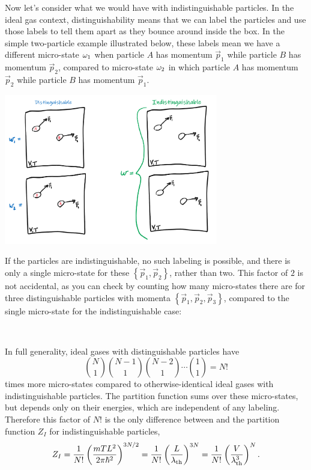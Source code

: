 Now let's consider what we would have with indistinguishable particles.
In the ideal gas context, distinguishability means that we can label the particles and use those labels to tell them apart as they bounce around inside the box.
In the simple two-particle example illustrated below, these labels mean we have a different micro-state $\omega_1$ when particle $A$ has momentum $\vec p_1$ while particle $B$ has momentum $\vec p_2$, compared to micro-state $\omega_2$ in which particle $A$ has momentum $\vec p_2$ while particle $B$ has momentum $\vec p_1$.
\begin{center}
  \includegraphics[width=0.7\textwidth]{figs/week04_distinguish.pdf}
\end{center}
If the particles are indistinguishable, no such labeling is possible, and there is only a single micro-state for these $\left\{\vec p_1, \vec p_2\right\}$, rather than two.
This factor of $2$ is not accidental, as you can check by counting how many micro-states there are for three distinguishable particles with momenta $\left\{\vec p_1, \vec p_2, \vec p_3\right\}$, compared to the single micro-state for the indistinguishable case:
\begin{mdframed}
  \ \\[100 pt]
\end{mdframed}

In full generality, ideal gases with distinguishable particles have
\begin{equation*}
  \binom{N}{1}\binom{N - 1}{1}\binom{N - 2}{1}\cdots\binom{1}{1} = N!
\end{equation*}
times more micro-states compared to otherwise-identical ideal gases with indistinguishable particles.
The partition function sums over these micro-states, but depends only on their energies, which are independent of any labeling.
Therefore this factor of $N!$ is the only difference between  and the partition function $Z_I$ for indistinguishable particles,
\begin{equation}
  \label{eq:ideal_indis}
  Z_I = \frac{1}{N!} \left(\frac{mTL^2}{2\pi\hbar^2}\right)^{3N / 2} = \frac{1}{N!} \left(\frac{L}{\lambda_{\mathrm{th}}}\right)^{3N} = \frac{1}{N!} \left(\frac{V}{\lambda_{\mathrm{th}}^3}\right)^N.
\end{equation}



